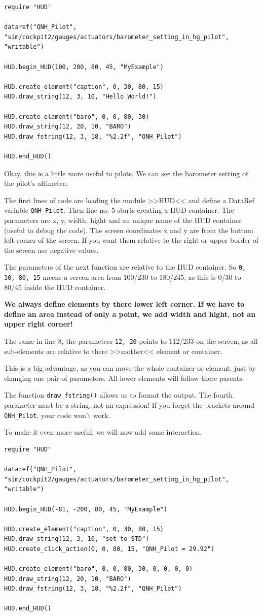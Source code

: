 \documentclass[11pt,parskip=half,a4paper]{scrartcl}
\begin{document}
\begin{lstlisting}[firstnumber=1]
require "HUD"

dataref("QNH_Pilot", "sim/cockpit2/gauges/actuators/barometer_setting_in_hg_pilot", "writable")

HUD.begin_HUD(100, 200, 80, 45, "MyExample")

HUD.create_element("caption", 0, 30, 80, 15)
HUD.draw_string(12, 3, 10, "Hello World!")

HUD.create_element("baro", 0, 0, 80, 30)
HUD.draw_string(12, 20, 10, "BARO")
HUD.draw_fstring(12, 3, 18, "%2.2f", "QNH_Pilot")

HUD.end_HUD()
\end{lstlisting}

Okay, this is a little more useful to pilots. We can see the barometer setting of the pilot's altimeter.

The first lines of code are loading the module >>HUD<< and define a DataRef variable \verb|QNH_Pilot|. Then line no. 5 starts creating a HUD container. The parameters are x, y, width, hight and an unique name of the HUD container (useful to debug the code). The screen coordinates x and y are from the bottom left corner of the screen. If you want them relative to the right or upper border of the screen use negative values.

The parameters of the next function are relative to the HUD container. So \verb|0, 30, 80, 15| meens a screen area from 100/230 to 180/245, as this is 0/30 to 80/45 inside the HUD container.

\textbf{We always define elements by there lower left corner. If we have to define an area instead of only a point, we add width and hight, not an upper right corner!}

The same in line 8, the parameters \verb|12, 20| points to 112/233 on the screen, as all sub-elements are relative to there >>mother<< element or container.

This is a big advantage, as you can move the whole container or element, just by changing one pair of parameters. All lower elements will follow there parents.

The function \verb|draw_fstring()| allows us to format the output. The fourth parameter must be a string, not an expression! If you forget the brackets around \verb|QNH_Pilot|, your code won't work.

To make it even more useful, we will now add some interaction.

\begin{lstlisting}[firstnumber=1]
require "HUD"

dataref("QNH_Pilot", "sim/cockpit2/gauges/actuators/barometer_setting_in_hg_pilot", "writable")

HUD.begin_HUD(-81, -200, 80, 45, "MyExample")

HUD.create_element("caption", 0, 30, 80, 15)
HUD.draw_string(12, 3, 10, "set to STD")
HUD.create_click_action(0, 0, 80, 15, "QNH_Pilot = 29.92")

HUD.create_element("baro", 0, 0, 80, 30, 0, 0, 0, 0)
HUD.draw_string(12, 20, 10, "BARO")
HUD.draw_fstring(12, 3, 18, "%2.2f", "QNH_Pilot")

HUD.end_HUD()
\end{lstlisting}
\end{document}
